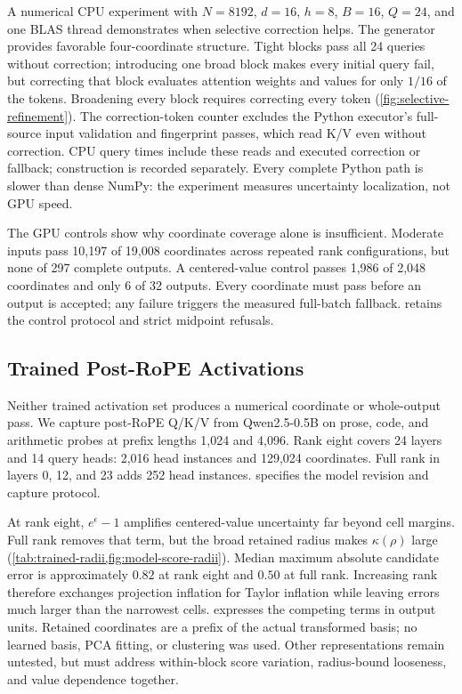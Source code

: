 A numerical CPU experiment with $N=8192$, $d=16$, $h=8$, $B=16$, $Q=24$, and
one BLAS thread demonstrates when selective correction helps. The generator
provides favorable four-coordinate structure. Tight blocks pass all 24 queries
without correction; introducing one broad block makes every initial query fail,
but correcting that block evaluates attention weights and values for only
$1/16$ of the tokens. Broadening every block requires correcting every token
(\cref{fig:selective-refinement}). The correction-token counter excludes the
Python executor's full-source input validation and fingerprint passes, which
read K/V even without correction. CPU query times include these reads and
executed correction or fallback; construction is recorded separately.
Every complete Python path is slower than
dense NumPy: the experiment measures uncertainty localization, not GPU speed.


The GPU controls show why coordinate coverage alone is insufficient. Moderate
inputs pass 10,197 of 19,008 coordinates across repeated rank configurations,
but none of 297 complete outputs. A centered-value control passes 1,986 of
2,048 coordinates and only 6 of 32 outputs. Every coordinate must pass before
an output is accepted; any failure triggers the measured full-batch fallback.
 retains the control protocol and strict
midpoint refusals.

\subsection{Trained Post-RoPE Activations}
\label{sec:trained-activations}

Neither trained activation set produces a numerical coordinate or whole-output
pass. We capture post-RoPE Q/K/V from Qwen2.5-0.5B \citep{qwen25} on prose,
code, and arithmetic probes at prefix lengths 1,024 and 4,096. Rank eight
covers 24 layers and 14 query heads: 2,016 head instances and 129,024
coordinates. Full rank in layers 0, 12, and 23 adds 252 head instances.
 specifies the model revision and capture protocol.

At rank eight, $e^\epsilon-1$ amplifies centered-value uncertainty far beyond
cell margins. Full rank removes that term, but the broad retained radius makes
$\kappa(\rho)$ large (\cref{tab:trained-radii,fig:model-score-radii}). Median
maximum absolute candidate error is approximately $0.82$ at rank eight and
$0.50$ at full rank. Increasing rank therefore exchanges projection inflation
for Taylor inflation while leaving errors much larger than the narrowest
cells.  expresses the competing terms in output
units. Retained coordinates are a prefix of the actual transformed basis; no
learned basis, PCA fitting, or clustering was used. Other representations
remain untested, but must address within-block score variation, radius-bound
looseness, and value dependence together.


